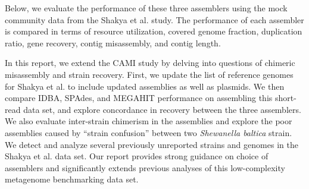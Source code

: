 \documentclass[11pt]{article}
\begin{document}
Below, we evaluate the performance of these three assemblers using the
mock community data from the Shakya et al. study.
The performance of each assembler is compared in terms
of resource utilization, covered genome fraction, duplication ratio, gene
recovery, contig misassembly, and contig length.


In this report, we extend the CAMI study by delving into questions of
chimeric misassembly and strain recovery.  First, we update the list
of reference genomes for Shakya et al.  to include updated assemblies
as well as plasmids. We then compare IDBA, SPAdes, and MEGAHIT
performance on assembling this short-read data set, and explore
concordance in recovery between the three assemblers.  We also evaluate
inter-strain chimerism in the assemblies and explore the poor
assemblies caused by ``strain confusion'' between two {\em Shewanella
  baltica} strain.  We detect and analyze several previously
unreported strains and genomes in the Shakya et al. data set. Our
report provides strong guidance on choice of assemblers and
significantly extends previous analyses of this low-complexity
metagenome benchmarking data set.





 
\end{document}
